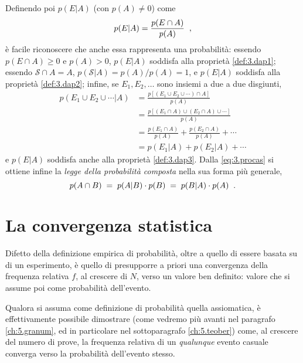 Definendo poi $p(E|A)$ (con $p(A) \ne 0$) come
\begin{equation}%
\label{eq:3.procas}%
\index{probabilit\`a!condizionata}
  p(E|A) = \frac{p(E \cap A)}{p(A)} \peq ,
\end{equation}
\`e facile riconoscere che anche essa rappresenta una
probabilit\`a: essendo $p(E \cap A) \geq 0$ e $p(A) > 0$,
$p(E|A)$ soddisfa alla propriet\`a \ref{def:3.dap1}; essendo
$\mathcal{S} \cap A = A$, $p(\mathcal{S}|A) = p(A)/p(A) =
1$, e $p(E|A)$ soddisfa alla propriet\`a \ref{def:3.dap2};
infine, se $E_1, E_2,\ldots$ sono insiemi a due a due
disgiunti,
\begin{align*}
  p(E_1 \cup E_2 \cup\cdots|A) &= \frac{p[(E_1 \cup
    E_2 \cup\cdots) \cap A]}{p(A)} \\[1ex]
  &= \frac{p[(E_1 \cap A) \cup (E_2 \cap A)
    \cup\cdots]}{p(A)} \\[1ex]
  &= \frac{p(E_1 \cap A)}{p(A)} + \frac{p(E_2 \cap A)}{
    p(A) } +\cdots \\[1.5ex]
  &= p(E_1|A) + p(E_2|A) +\cdots
\end{align*}
e $p(E|A)$ soddisfa anche alla propriet\`a \ref{def:3.dap3}.
Dalla \eqref{eq:3.procas} si ottiene infine la \emph{legge
  della probabilit\`a composta} nella sua forma pi\`u
generale,
\begin{equation*}%
\index{probabilit\`a!composta (teorema della)}
  p(A \cap B) \; = \; p(A|B) \cdot p(B) \; = \; p(B|A)
    \cdot  p(A) \peq .
\end{equation*}

\section{La convergenza statistica}%
%
%
\label{ch:3.convstat}
Difetto della definizione empirica di probabilit\`a, oltre a
quello di essere basata su di un esperimento, \`e quello di
presupporre a priori una convergenza della frequenza
relativa $f$, al crescere di $N$, verso un valore ben
definito: valore che si assume poi come probabilit\`a
dell'evento.

%
Qualora si assuma come definizione di probabilit\`a quella
assiomatica, \`e effettivamente possibile dimostrare (come
vedremo pi\`u avanti nel paragrafo \ref{ch:5.granum}, ed in
particolare nel sottoparagrafo \ref{ch:5.teober}) come, al
crescere del numero di prove, la frequenza relativa di un
\emph{qualunque} evento casuale converga verso la
probabilit\`a dell'evento stesso.

